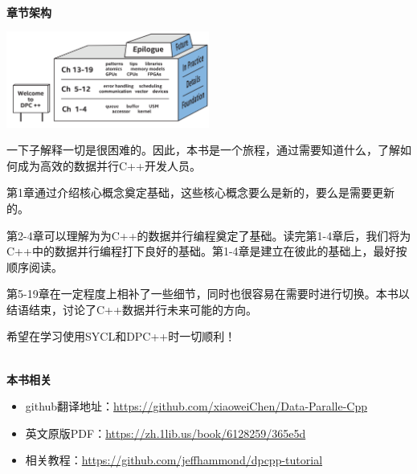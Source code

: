 \documentclass[11pt,a4paper,UTF8]{ctexart}
\begin{document}
	\hspace*{\fill} \\ %
	\noindent\textbf{章节架构}\ \par
	\begin{center}
		\includegraphics[width=0.5\textwidth]{images/struct-introduce}
	\end{center} \par
	一下子解释一切是很困难的。因此，本书是一个旅程，通过需要知道什么，了解如何成为高效的数据并行C++开发人员。\par
	
	第1章通过介绍核心概念奠定基础，这些核心概念要么是新的，要么是需要更新的。\par
	
	第2-4章可以理解为为C++的数据并行编程奠定了基础。读完第1-4章后，我们将为C++中的数据并行编程打下良好的基础。第1-4章是建立在彼此的基础上，最好按顺序阅读。\par
	
	第5-19章在一定程度上相补了一些细节，同时也很容易在需要时进行切换。本书以结语结束，讨论了C++数据并行未来可能的方向。\par
	
	希望在学习使用SYCL和DPC++时一切顺利！\par
	
	\hspace*{\fill} \\ %
	\noindent\textbf{本书相关}\ \par
	\begin{itemize}
		\item github翻译地址：\href{https://github.com/xiaoweiChen/Data-Paralle-Cpp}{https://github.com/xiaoweiChen/Data-Paralle-Cpp}
		\item 英文原版PDF：\href{https://zh.1lib.us/book/6128259/365e5d}{https://zh.1lib.us/book/6128259/365e5d}
		\item 相关教程：\href{https://github.com/jeffhammond/dpcpp-tutorial}{https://github.com/jeffhammond/dpcpp-tutorial}
	\end{itemize}
	\newpage
	
	\tableofcontents
	\newpage
	
	\pagestyle{empty}
	
\end{document}
